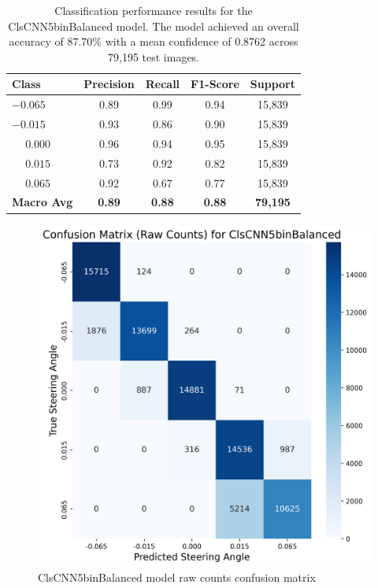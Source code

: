 \begin{table}[htbp]
\centering
\begin{tabular}{@{}lcccc@{}}
\toprule
\textbf{Class} & \textbf{Precision} & \textbf{Recall} & \textbf{F1-Score} & \textbf{Support} \\
\midrule
$-0.065$ & 0.89 & 0.99 & 0.94 & 15,839 \\
$-0.015$ & 0.93 & 0.86 & 0.90 & 15,839 \\
$\phantom{-}0.000$ & 0.96 & 0.94 & 0.95 & 15,839 \\
$\phantom{-}0.015$ & 0.73 & 0.92 & 0.82 & 15,839 \\
$\phantom{-}0.065$ & 0.92 & 0.67 & 0.77 & 15,839 \\
\midrule
\textbf{Macro Avg} & \textbf{0.89} & \textbf{0.88} & \textbf{0.88} & \textbf{79,195} \\
\bottomrule
\end{tabular}
\caption{Classification performance results for the ClsCNN5binBalanced model. The model achieved an overall accuracy of 87.70\% with a mean confidence of 0.8762 across 79,195 test images.}
\label{tab:clf_report_ClsCNN5binBalanced}
\end{table}


\begin{figure}[H]
\centering
\includegraphics[width=0.65\linewidth]{Figures/Results/cm_raw_ClsCNN5binBalanced.png}
\caption{ClsCNN5binBalanced model raw counts confusion matrix}
\label{fig:cm_raw_ClsCNN5binBalanced}
\end{figure}


